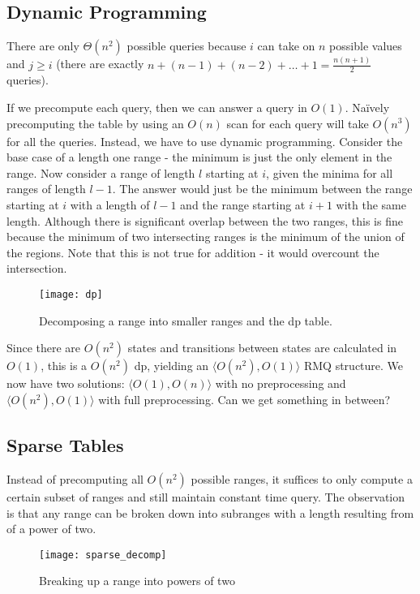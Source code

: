 \documentclass[11pt, oneside]{article}
\begin{document}
\subsection{Dynamic Programming}

There are only \( \Theta(n^2) \) possible queries because \( i \) can take on \( n \) possible values
and \( j \geq i \) (there are exactly \( n + (n - 1) + (n - 2) + \ldots + 1 = \frac{n(n + 1)}{2} \) queries).

If we precompute each query, then we can answer a query in \( O(1) \). Naïvely precomputing the table
by using an \( O(n) \) scan for each query will take \( O(n^3) \) for all the queries.
Instead, we have to use dynamic programming. Consider the base case of a length one range -
the minimum is just the only element in the range. Now consider a range of length \( l \) starting
at \( i \), given the minima for all ranges of length \( l - 1 \).
The answer would just be the minimum between the range starting at \( i \) with a length of \( l - 1 \)
and the range starting at \( i + 1 \) with the same length. Although there is significant overlap between
the two ranges, this is fine because the minimum of two intersecting ranges is the minimum of the union
of the regions. Note that this is not true for addition - it would overcount the intersection.

\begin{figure}[h!]
\centering
\texttt{[image: dp]}
\caption{Decomposing a range into smaller ranges and the dp table.}
\end{figure}

Since there are \( O(n^2) \) states and transitions between states are calculated in \( O(1) \),
this is a \( O(n^2) \) dp, yielding an \( \langle O(n^2), O(1) \rangle \) RMQ structure. We now have two solutions:
\( \langle O(1), O(n) \rangle \) with no preprocessing and \( \langle O(n^2), O(1) \rangle \) with full preprocessing. Can we get something in between?

\subsection{Sparse Tables}

Instead of precomputing all \( O(n^2) \) possible ranges, it suffices to only compute a certain subset of ranges
and still maintain constant time query. The observation is that any range can be broken down into subranges
with a length resulting from of a power of two.

\begin{figure}[h!]
\centering
\texttt{[image: sparse\_decomp]}
\caption{Breaking up a range into powers of two}
\end{figure}
\end{document}
